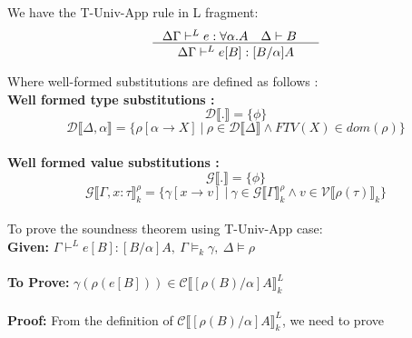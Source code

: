 \documentclass[12pt]{article}
\author{Ankit Kumar}
\begin{document}
We have the T-Univ-App rule in L fragment:\\
$$
\inference{\Delta\Gamma \vdash^{L} e:\forall \alpha.A \quad \Delta \vdash
B \quad }{\Delta\Gamma \vdash^{L} e[B]:[B/\alpha]A}  
$$

Where well-formed substitutions are defined as follows :\\
\textbf{Well formed type substitutions :}\\
$$
\mathcal{D}\llbracket . \rrbracket = \{\phi\}
$$
$$
\mathcal{D}\llbracket \Delta,\alpha \rrbracket = \{\rho[\alpha \rightarrow X]\ |\
\rho \in \mathcal{D}\llbracket \Delta \rrbracket \wedge FTV(X) \in dom(\rho) \}
$$
\\
\textbf{Well formed value substitutions :}\\
$$
\mathcal{G}\llbracket . \rrbracket = \{\phi\}
$$
$$
\mathcal{G}\llbracket \Gamma , x:\tau \rrbracket^\rho_k = \{\gamma [x
\rightarrow v]\ |\ \gamma \in \mathcal{G}\llbracket \Gamma
\rrbracket^\rho_k \wedge v \in  \mathscr{V} \llbracket \rho(\tau) \rrbracket_k \}
$$
\\
To prove the soundness theorem using T-Univ-App case:\\
\textbf{Given:} $\Gamma \vdash^L  e [B] : [B/\alpha]A,\
\Gamma \vDash_k  \gamma,\ \Delta \vDash \rho$\\
\\
\textbf{To Prove:} $\gamma(\rho(e [B])) \in
\mathscr{C}\llbracket [\rho(B)/\alpha]A \rrbracket_k^L$\\
\\
\textbf{Proof:} From the definition of $\mathscr{C}\llbracket
[\rho(B)/\alpha]A \rrbracket_k^L$, we need to prove
\\
\end{document}
